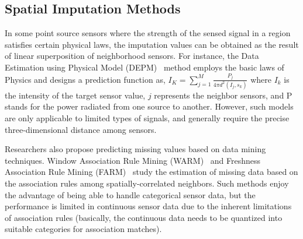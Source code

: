 \subsection{Spatial Imputation Methods}
In some point source sensors where the strength of the sensed signal in a region satisfies certain physical laws, the imputation values can be obtained as the result of linear superposition of neighborhood sensors.
For instance, the Data Estimation using Physical Model (DEPM)~\cite{li2008data} method employs the basic laws of Physics and 
designs a prediction function as,  
$I_K =\sum_{j=1}^M\frac{P_j}{4\pi d^2(I_j,s_k)}$
where $I_k$ is the intensity of the target sensor value, $j$ represents the neighbor sensors, and P stands for the power radiated from one source to another. 
However, such models are only applicable to limited types of signals, and generally require the precise three-dimensional distance among sensors.

Researchers also propose predicting missing values based on data mining techniques. Window Association Rule Mining (WARM)~\cite{le2005estimating} and Freshness Association Rule Mining (FARM)~\cite{Gruenwald:FARM} study the estimation of missing data based on the association rules among spatially-correlated neighbors. 
Such methods enjoy the advantage of being able to handle categorical sensor data, but the performance is limited in continuous sensor data due to the inherent limitations of association rules (basically, the continuous data needs to be quantized into suitable
categories for association matches).

